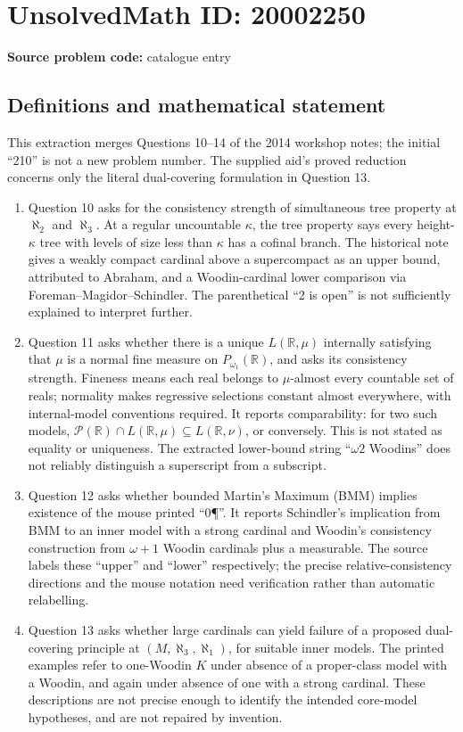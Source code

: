 \documentclass[11pt]{article}
\newcommand{\R}{\mathbb{R}}
\begin{document}
\section*{UnsolvedMath ID: 20002250}
\textbf{Source problem code:} catalogue entry
\subsection{Definitions and mathematical statement}
This extraction merges Questions 10--14 of the 2014 workshop notes; the initial ``210'' is not a new problem number. The supplied aid's proved reduction concerns only the literal dual-covering formulation in Question 13.
\begin{enumerate}
\item Question 10 asks for the consistency strength of simultaneous tree property at \(\aleph_2\) and \(\aleph_3\). At a regular uncountable \(\kappa\), the tree property says every height-\(\kappa\) tree with levels of size less than \(\kappa\) has a cofinal branch. The historical note gives a weakly compact cardinal above a supercompact as an upper bound, attributed to Abraham, and a Woodin-cardinal lower comparison via Foreman--Magidor--Schindler. The parenthetical ``2 is open'' is not sufficiently explained to interpret further.
\item Question 11 asks whether there is a unique \(L(\R,\mu)\) internally satisfying that \(\mu\) is a normal fine measure on \(P_{\omega_1}(\R)\), and asks its consistency strength. Fineness means each real belongs to \(\mu\)-almost every countable set of reals; normality makes regressive selections constant almost everywhere, with internal-model conventions required. It reports comparability: for two such models, \(\mathcal P(\R)\cap L(\R,\mu)\subseteq L(\R,\nu)\), or conversely. This is not stated as equality or uniqueness. The extracted lower-bound string ``\(\omega2\) Woodins'' does not reliably distinguish a superscript from a subscript.
\item Question 12 asks whether bounded Martin's Maximum (BMM) implies existence of the mouse printed ``0¶''. It reports Schindler's implication from BMM to an inner model with a strong cardinal and Woodin's consistency construction from \(\omega+1\) Woodin cardinals plus a measurable. The source labels these ``upper'' and ``lower'' respectively; the precise relative-consistency directions and the mouse notation need verification rather than automatic relabelling.
\item Question 13 asks whether large cardinals can yield failure of a proposed dual-covering principle at \((M,\aleph_3,\aleph_1)\), for suitable inner models. The printed examples refer to one-Woodin \(K\) under absence of a proper-class model with a Woodin, and again under absence of one with a strong cardinal. These descriptions are not precise enough to identify the intended core-model hypotheses, and are not repaired by invention.

\end{enumerate}
\end{document}
